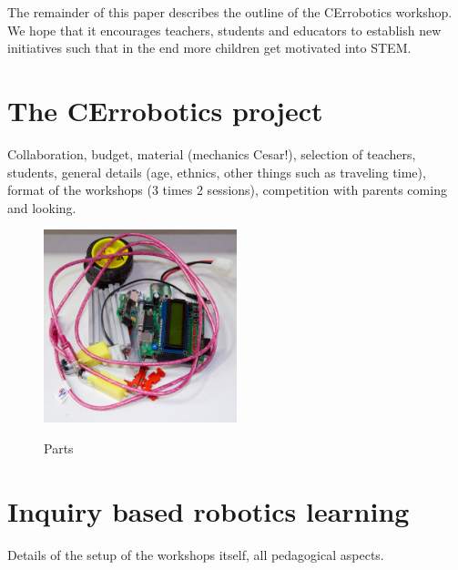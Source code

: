 \documentclass[a4paper]{llncs}
\begin{document}
The remainder of this paper describes the outline of the CErrobotics workshop.
We hope that it encourages teachers, students and educators to establish new initiatives such that in the end more children get motivated into STEM.

\section{The CErrobotics project}
Collaboration, budget, material (mechanics Cesar!), selection of teachers, students, general details (age, ethnics, other things such as traveling time), format of the workshops (3 times 2 sessions), competition with parents coming and looking.
\begin{figure}[htp]
\begin{center}
\includegraphics[width=0.5\textwidth]{img/robot_parts.jpg}\label{fig:parts}
\caption[]{Parts}
\end{center}
\end{figure}

\section{Inquiry based robotics learning}
Details of the setup of the workshops itself, all pedagogical aspects.
\end{document}
